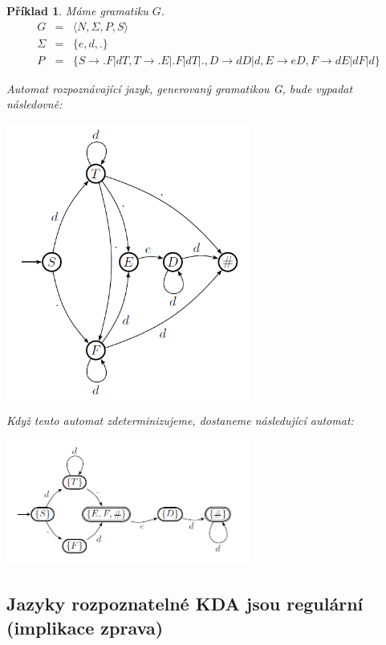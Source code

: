 \documentclass[10pt,a4paper]{article}
\theoremstyle{note}
\newtheorem{priklad}{Příklad}
\begin{document}
\begin{priklad}
Máme gramatiku $G$.
\begin{eqnarray*}
G &=& \langle N,\Sigma,P,S \rangle \\
\Sigma &=& \lbrace e,d,. \rbrace \\
P &=& \lbrace S \rightarrow .F | dT , T \rightarrow .E|.F|dT|. , D \rightarrow dD|d , E \rightarrow eD , F \rightarrow dE|dF|d \rbrace
\end{eqnarray*}

Automat rozpoznávající jazyk, generovaný gramatikou G, bude vypadat následovně:

\begin{center}
\centering\includegraphics[width=8cm]{img/reg1.png}
\end{center}

Když tento automat zdeterminizujeme, dostaneme následující automat:

\begin{center}
\centering\includegraphics[width=8cm]{img/reg2.png}
\end{center}

\end{priklad}

\subsection{Jazyky rozpoznatelné KDA jsou regulární (implikace zprava)}
\end{document}
